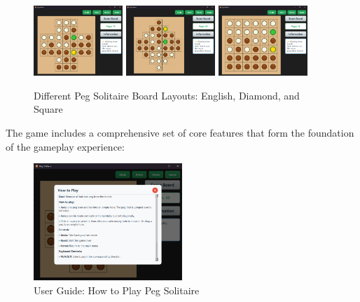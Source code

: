 \begin{figure}[btp]
    \centering
    \includegraphics[width=0.3\textwidth]{resource/board-demos/EnglishBoard.png}
    \includegraphics[width=0.3\textwidth]{resource/board-demos/DiamondBoard.png}
    \includegraphics[width=0.3\textwidth]{resource/board-demos/SquareBoard.png}
    \caption{Different Peg Solitaire Board Layouts: English, Diamond, and Square}
    \label{fig:english-board}
\end{figure}

The game includes a comprehensive set of core features that form the foundation of the gameplay experience:

\begin{figure}[btp]
    \centering
    \includegraphics[width=0.5\textwidth]{resource/Guide.png}
    \caption{User Guide: How to Play Peg Solitaire}
    \label{fig:user-guide}
\end{figure}

